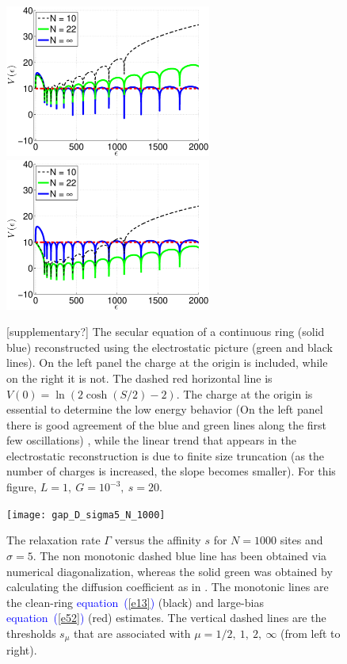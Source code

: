 \documentclass[aps,pre,floats,floatfix,twocolumn]{revtex4}
\newcommand{\Eq}[1]{\textcolor{blue}{{equation}\!~(\ref{#1})}}
\newcommand{\rmrk}[1]{{\color[rgb]{0.6,0,0.1} #1}}
\begin{document}
\begin{figure}
\includegraphics[height=5cm]{gRing_ES_vs_cont}
\includegraphics[height=5cm]{gRing_ES_vs_cont2}

\caption{\label{figReconstruction} \rmrk{[supplementary?]}
The secular equation of a continuous ring (solid blue) reconstructed using the electrostatic picture (green and black lines).
On the left panel the charge at the origin is included, while on the right it is not. 
The dashed red horizontal line is $V(0)=\ln(2\cosh(S/2)-2)$.
The charge at the origin is essential to determine the low energy behavior 
(On the left panel there is good agreement of the blue and green lines along the first few oscillations) , 
while the linear trend that appears in the electrostatic reconstruction is due to finite size truncation (as the number of charges is increased, the slope becomes smaller). 
For this figure, ${L=1, \ G=10^{-3}, \ s=20}$.
}
\end{figure}


\begin{figure}
\texttt{[image: gap\_D\_sigma5\_N\_1000]}

\caption{\label{f1}
The relaxation rate $\Gamma$ versus the affinity $s$ for $N{=}1000$ sites and $\sigma{=}5$. 
The non monotonic dashed blue line has been obtained via numerical diagonalization, 
whereas the solid green was obtained by calculating the diffusion coefficient as in \cite{nes}.
The monotonic lines are the clean-ring \Eq{e13} (black) and large-bias \Eq{e52} (red) estimates. 
The vertical dashed lines are the thresholds $s_{\mu}$ 
that are associated with ${\mu= 1/2, \ 1, \ 2, \ \infty}$ (from left to right).
}
\end{figure}
\end{document}
